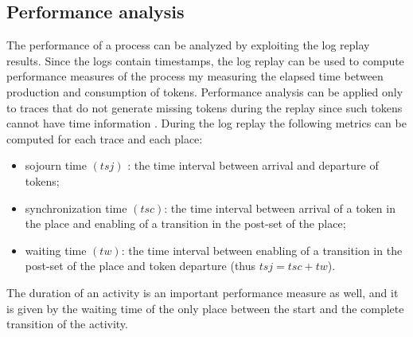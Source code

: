 \documentclass{llncs}
\begin{document}
\subsection{Performance analysis}\label{PerformanceAnalysis}
The performance of a process can be analyzed by exploiting the log
replay results. Since the logs contain timestamps, the log replay can
be used to compute performance measures of the process my measuring the elapsed time between production and consumption of tokens. Performance analysis can be applied only to traces that do not generate missing tokens during the replay since such tokens cannot have time information \cite{2} . During the log replay the following metrics can be computed for each trace and each place:
\begin{itemize}
\item sojourn time $(tsj)$ : the time interval between arrival and departure of tokens;
\item synchronization time $(tsc)$: the time interval between arrival of a token in the place and enabling of a transition in the post-set of the place;
\item waiting time $(tw)$:  the time interval between enabling of a transition in the post-set of the place and token departure (thus $tsj=tsc+tw $).
\end{itemize}

The duration of an activity is an important performance measure as well, and it is given by the waiting time of the only place between the start and the complete transition of the activity.
\end{document}
